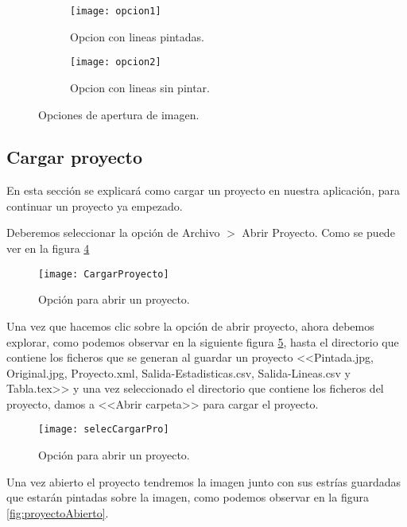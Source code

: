 \begin{figure}
	\begin{subfigure}[c]{.55\linewidth}
	\centering\large \texttt{[image: opcion1]}
	\caption{Opcion con lineas pintadas.}\label{fig:opcion1}
	\end{subfigure}%
	\begin{subfigure}[c]{.55\linewidth}
	\centering\large \texttt{[image: opcion2]}
	\caption{Opcion con lineas sin pintar.}\label{fig:opcion2}
	\end{subfigure}%
	\label{fig:figuraTipos}
	\caption{Opciones de apertura de imagen.}
\end{figure}




\subsection{Cargar proyecto}
\label{modo:2}

En esta sección se explicará como cargar un proyecto en nuestra aplicación, para continuar un proyecto ya empezado.

Deberemos seleccionar la opción de Archivo  $>$ Abrir Proyecto. Como se puede ver en la figura \ref{fig:cargarPro}


\begin{figure}[h]
\centering
\texttt{[image: CargarProyecto]}
\caption{Opción para abrir un proyecto.}
\label{fig:cargarPro}
\end{figure}

Una vez que hacemos clic sobre la opción de abrir proyecto, ahora debemos explorar, como podemos observar en la siguiente figura \ref{fig:selecCargarPro}, hasta el directorio que contiene los ficheros que se generan al guardar un proyecto \textrm{<<Pintada.jpg, Original.jpg, Proyecto.xml, Salida-Estadisticas.csv, Salida-Lineas.csv y Tabla.tex>>}  y una vez seleccionado el directorio que contiene los ficheros del proyecto, damos a \textrm{<<Abrir carpeta>>} para cargar el proyecto. 



\begin{figure}[h]
\centering
\texttt{[image: selecCargarPro]}
\caption{Opción para abrir un proyecto.}
\label{fig:selecCargarPro}
\end{figure}

Una vez abierto el proyecto tendremos la imagen junto con sus estrías guardadas que estarán pintadas sobre la imagen, como podemos observar en la figura \ref{fig:proyectoAbierto}.


